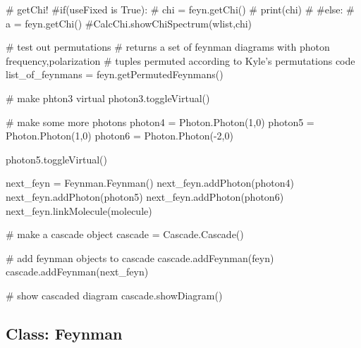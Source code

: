 \documentclass[11pt,a4paper,notitlepage]{article}
\begin{document}
\begin{code}
# getChi!
#if(useFixed is True):
#    chi = feyn.getChi()
#    print(chi)
#
#else:
#    a = feyn.getChi()
#CalcChi.showChiSpectrum(wlist,chi)


# test out permutations
# returns a set of feynman diagrams with photon frequency,polarization
# tuples permuted according to Kyle's permutations code
list_of_feynmans = feyn.getPermutedFeynmans()

# make phton3 virtual
photon3.toggleVirtual()

# make some more photons
photon4 = Photon.Photon(1,0)
photon5 = Photon.Photon(1,0)
photon6 = Photon.Photon(-2,0)

photon5.toggleVirtual()

next_feyn = Feynman.Feynman()
next_feyn.addPhoton(photon4)
next_feyn.addPhoton(photon5)
next_feyn.addPhoton(photon6)
next_feyn.linkMolecule(molecule)

# make a cascade object
cascade = Cascade.Cascade()

# add feynman objects to cascade
cascade.addFeynman(feyn)
cascade.addFeynman(next_feyn)

# show cascaded diagram
cascade.showDiagram()
\end{code}

\subsection{Class: Feynman}
\end{document}
